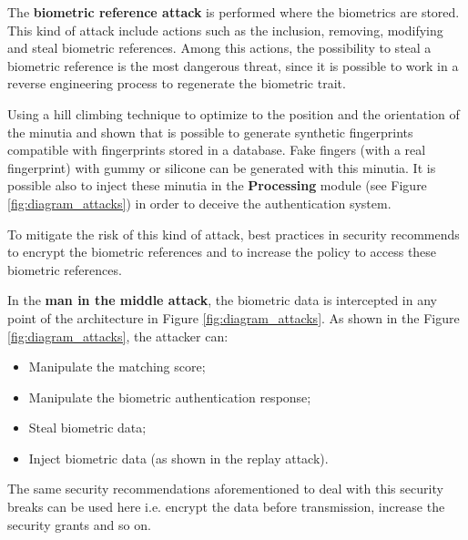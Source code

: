 
The \textbf{biometric reference attack} is performed where the biometrics are stored. This kind of attack include actions such as the inclusion, removing, modifying and steal biometric references. Among this actions, the possibility to steal a biometric reference is the most dangerous threat, since it is possible to work in a reverse engineering process to regenerate the biometric trait. 

Using a hill climbing technique to optimize to the position and the orientation of the minutia \cite{MartinezDiaz2006} and \cite{hill2001risk} shown that is possible to generate synthetic fingerprints compatible with fingerprints stored in a database. Fake fingers (with a real fingerprint) with gummy or silicone can be generated with this minutia. It is possible also to inject these minutia in the \textbf{Processing} module (see Figure \ref{fig:diagram_attacks}) in order to deceive the authentication system. 

To mitigate the risk of this kind of attack, best practices in security recommends to encrypt the biometric references and to increase the policy to access these biometric references. 


In the \textbf{man in the middle attack}, the biometric data is intercepted in any point of the architecture in Figure \ref{fig:diagram_attacks}.  As shown in the Figure \ref{fig:diagram_attacks}, the attacker can:
\begin{itemize}
        \item Manipulate the matching score;
        \item Manipulate the biometric authentication response;
        \item Steal biometric data;
        \item Inject biometric data (as shown in the replay attack).
\end{itemize}

The same security recommendations aforementioned to deal with this security breaks can be used here i.e. encrypt the data before transmission, increase the security grants and so on. 

